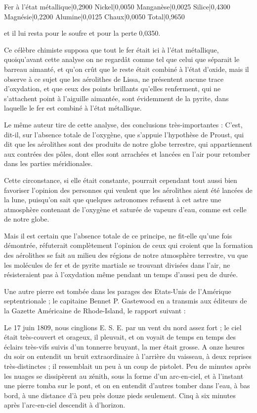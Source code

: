 \documentclass[a4paper, 12pt, oneside, french]{article}
\begin{document}
Fer à l'état métallique|0,2900  
Nickel|0,0050  
Manganèse|0,0025  
Silice|0,4300  
Magnésie|0,2200  
Alumine|0,0125  
Chaux|0,0050  
Total|0,9650

et il lui resta pour le soufre et pour la perte 0,0350.

Ce célèbre chimiste supposa que tout le fer était ici à l'état métallique, quoiqu'avant cette analyse on ne regardât comme tel que celui que séparait le barreau aimanté, et qu'on crût que le reste était combiné à l'état d'oxide, mais il observe à ce sujet que les aérolithes de Lissa, ne présentent aucune trace d'oxydation, et que ceux des points brillants qu'elles renferment, qui ne s'attachent point à l'aiguille aimantée, sont évidemment de la pyrite, dans laquelle le fer est combiné à l'état métallique.

Le même auteur tire de cette analyse, des conclusions très-importantes : \og C'est, dit-il, sur l'absence totale de l'oxygène, que s'appuie l'hypothèse de Proust, qui dit que les aérolithes sont des produits de notre globe terrestre, qui appartiennent aux contrées des pôles, dont elles sont arrachées et lancées en l'air pour retomber dans les parties méridionales. \fg

Cette circonstance, si elle était constante, pourrait cependant tout aussi bien favoriser l'opinion des personnes qui veulent que les aérolithes aient été lancées de la lune, puisqu'on sait que quelques astronomes refusent à cet astre une atmosphère contenant de l'oxygène et saturée de vapeurs d'eau, comme est celle de notre globe.

Mais il est certain que l'absence totale de ce principe, ne fit-elle qu'une fois démontrée, réfuterait complètement l'opinion de ceux qui croient que la formation des aérolithes se fait au milieu des régions de notre atmosphère terrestre, vu que les molécules de fer et de pyrite martiale se trouvant divisées dans l'air, ne résisteraient pas à l'oxydation même pendant un temps d'aussi peu de durée.

Une autre pierre est tombée dans les parages des Etats-Unis de l'Amérique septentrionale ; le capitaine Bennet P. Gastewood en a transmis aux éditeurs de la Gazette Américaine de Rhode-Island, le rapport suivant :

\og Le 17 juin 1809, nous cinglions E. S. E. par un vent du nord assez fort ; le ciel était très-couvert et orageux, il pleuvait, et on voyait de temps en temps des éclairs très-vifs suivis d'un tonnerre bruyant, la mer était grosse. A onze heures du soir on entendit un bruit extraordinaire à l'arrière du vaisseau, à deux reprises très-distinctes ; il ressemblait un peu à un coup de pistolet. Peu de minutes après les nuages se dissipèrent au zénith, sous la forme d'un arc-en-ciel, et à l'instant une pierre tomba sur le pont, et on en entendit d'autres tomber dans l'eau, à bas bord, à une distance d'à peu près douze pieds seulement. Cinq à six minutes après l'arc-en-ciel descendit à d'horizon. \fg
\end{document}
